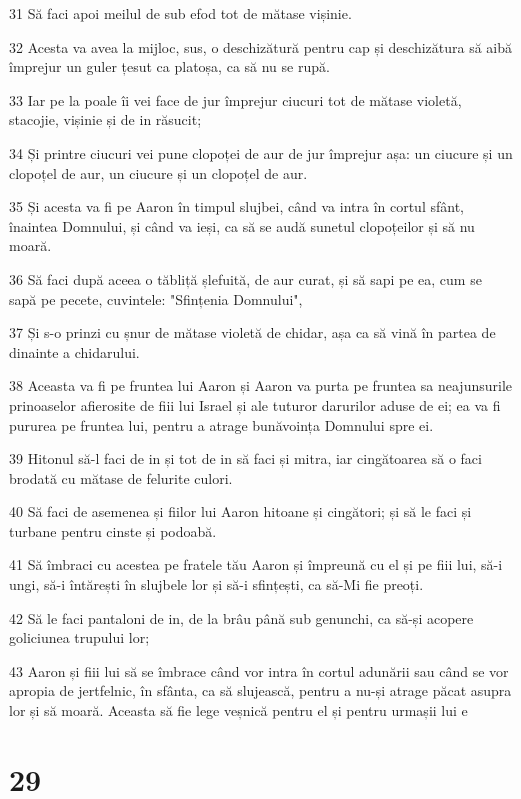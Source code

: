 \par 31 Să faci apoi meilul de sub efod tot de mătase vișinie.
\par 32 Acesta va avea la mijloc, sus, o deschizătură pentru cap și deschizătura să aibă împrejur un guler țesut ca platoșa, ca să nu se rupă.
\par 33 Iar pe la poale îi vei face de jur împrejur ciucuri tot de mătase violetă, stacojie, vișinie și de in răsucit;
\par 34 Și printre ciucuri vei pune clopoței de aur de jur împrejur așa: un ciucure și un clopoțel de aur, un ciucure și un clopoțel de aur.
\par 35 Și acesta va fi pe Aaron în timpul slujbei, când va intra în cortul sfânt, înaintea Domnului, și când va ieși, ca să se audă sunetul clopoțeilor și să nu moară.
\par 36 Să faci după aceea o tăbliță șlefuită, de aur curat, și să sapi pe ea, cum se sapă pe pecete, cuvintele: "Sfințenia Domnului",
\par 37 Și s-o prinzi cu șnur de mătase violetă de chidar, așa ca să vină în partea de dinainte a chidarului.
\par 38 Aceasta va fi pe fruntea lui Aaron și Aaron va purta pe fruntea sa neajunsurile prinoaselor afierosite de fiii lui Israel și ale tuturor darurilor aduse de ei; ea va fi pururea pe fruntea lui, pentru a atrage bunăvoința Domnului spre ei.
\par 39 Hitonul să-l faci de in și tot de in să faci și mitra, iar cingătoarea să o faci brodată cu mătase de felurite culori.
\par 40 Să faci de asemenea și fiilor lui Aaron hitoane și cingători; și să le faci și turbane pentru cinste și podoabă.
\par 41 Să îmbraci cu acestea pe fratele tău Aaron și împreună cu el și pe fiii lui, să-i ungi, să-i întărești în slujbele lor și să-i sfințești, ca să-Mi fie preoți.
\par 42 Să le faci pantaloni de in, de la brâu până sub genunchi, ca să-și acopere goliciunea trupului lor;
\par 43 Aaron și fiii lui să se îmbrace când vor intra în cortul adunării sau când se vor apropia de jertfelnic, în sfânta, ca să slujească, pentru a nu-și atrage păcat asupra lor și să moară. Aceasta să fie lege veșnică pentru el și pentru urmașii lui e

\chapter{29}

